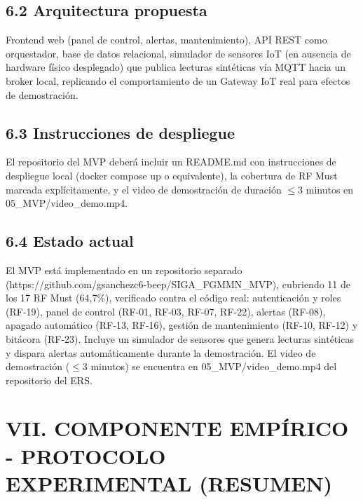 \subsection*{6.2 Arquitectura propuesta}


Frontend web (panel de control, alertas, mantenimiento), API REST como orquestador, base de datos relacional, simulador de sensores IoT (en ausencia de hardware físico desplegado) que publica lecturas sintéticas vía MQTT hacia un broker local, replicando el comportamiento de un Gateway IoT real para efectos de demostración.


\subsection*{6.3 Instrucciones de despliegue}


El repositorio del MVP deberá incluir un README.md con instrucciones de despliegue local (docker compose up o equivalente), la cobertura de RF Must marcada explícitamente, y el video de demostración de duración $\leq$3 minutos en 05\_MVP/video\_demo.mp4.


\subsection*{6.4 Estado actual}


El MVP está implementado en un repositorio separado (https://github.com/gsanchezc6-beep/SIGA\_FGMMN\_MVP), cubriendo 11 de los 17 RF Must (64,7\%), verificado contra el código real: autenticación y roles (RF-19), panel de control (RF-01, RF-03, RF-07, RF-22), alertas (RF-08), apagado automático (RF-13, RF-16), gestión de mantenimiento (RF-10, RF-12) y bitácora (RF-23). Incluye un simulador de sensores que genera lecturas sintéticas y dispara alertas automáticamente durante la demostración. El video de demostración ($\leq$3 minutos) se encuentra en 05\_MVP/video\_demo.mp4 del repositorio del ERS.


\section*{VII. COMPONENTE EMPÍRICO - PROTOCOLO EXPERIMENTAL (RESUMEN)}

